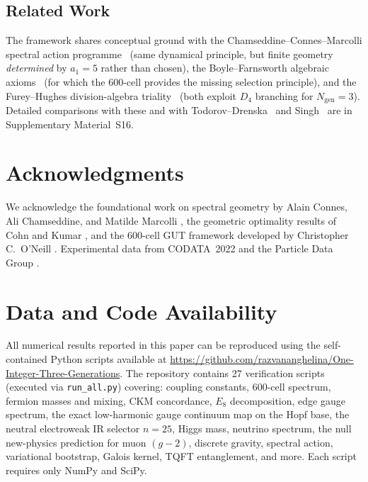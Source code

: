 \documentclass[12pt,a4paper]{article}
\theoremstyle{definition}
\begin{document}
\subsection{Related Work}

The framework shares conceptual ground with the Chamseddine--Connes--Marcolli spectral action programme~\cite{chamseddine1997,ccm2007} (same dynamical principle, but finite geometry \emph{determined} by $a_1 = 5$ rather than chosen), the Boyle--Farnsworth algebraic axioms~\cite{boyle2020} (for which the 600-cell provides the missing selection principle), and the Furey--Hughes division-algebra triality~\cite{furey2024} (both exploit $D_4$ branching for $N_{\text{gen}} = 3$).  Detailed comparisons with these and with Todorov--Drenska~\cite{todorov2020} and Singh~\cite{singh2025} are in Supplementary Material~S16.

\section*{Acknowledgments}

We acknowledge the foundational work on spectral geometry by Alain Connes, Ali Chamseddine, and Matilde Marcolli \cite{chamseddine1997,ccm2007}, the geometric optimality results of Cohn and Kumar \cite{cohn2007,cohn2011}, and the 600-cell GUT framework developed by Christopher C.\ O'Neill \cite{oneill2025gut,oneill2023binary}. Experimental data from CODATA~2022 \cite{codata2022} and the Particle Data Group \cite{pdg2024}.

\section*{Data and Code Availability}

All numerical results reported in this paper can be reproduced using the self-contained Python scripts available at \url{https://github.com/razvananghelina/One-Integer-Three-Generations}. The repository contains 27 verification scripts (executed via \texttt{run\_all.py}) covering: coupling constants, 600-cell spectrum, fermion masses and mixing, CKM concordance, $E_8$ decomposition, edge gauge spectrum, the exact low-harmonic gauge continuum map on the Hopf base, the neutral electroweak IR selector $n=25$, Higgs mass, neutrino spectrum, the null new-physics prediction for muon $(g-2)$, discrete gravity, spectral action, variational bootstrap, Galois kernel, TQFT entanglement, and more. Each script requires only NumPy and SciPy.
\end{document}
